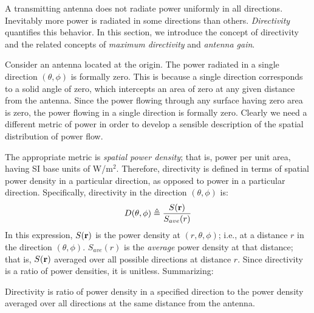 

\label{m0203_Directivity_and_Gain} %

A transmitting antenna does not radiate power uniformly in all directions.
Inevitably more power is radiated in some directions than others.
\emph{Directivity} quantifies this behavior.
In this section, we introduce the concept of directivity and the related concepts of \emph{maximum directivity} and \emph{antenna gain}.

Consider an antenna located at the origin.
The power radiated in a single direction $(\theta,\phi)$ is formally zero.
This is because a single direction corresponds to a solid angle of zero, which intercepts an area of zero at any given distance from the antenna.
Since the power flowing through any surface having zero area is zero, the power flowing in a single direction is formally zero.
Clearly we need a different metric of power in order to develop a sensible description of the spatial distribution of power flow.

The appropriate metric is \emph{spatial power density}; that is, power per unit area, having SI base units of W/m$^2$.
Therefore, directivity is defined in terms of spatial power density in a particular direction, as opposed to power in a particular direction.
Specifically, directivity in the direction $(\theta,\phi)$ is:
%
\begin{equation}
D(\theta,\phi) \triangleq \frac{S({\bf r})}{S_{ave}(r)}
\label{m0203_eDirDef}
\end{equation}
%
In this expression, $S({\bf r})$ is the power density at $(r,\theta,\phi)$; i.e., at a distance $r$ in the direction $(\theta,\phi)$. 
$S_{ave}(r)$ is the \emph{average} power density at that distance; that is, $S({\bf r})$ averaged over all possible directions at distance $r$.
Since directivity is a ratio of power densities, it is unitless.
Summarizing:
\begin{mdframed}[backgroundcolor=yellow!20,nobreak=true] 
Directivity is ratio of power density in a specified direction to the power density averaged over all directions at the same distance from the antenna.
\end{mdframed}

